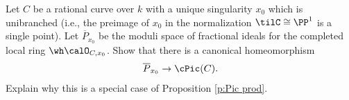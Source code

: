 \subsubsection{} Let $C$ be a rational curve over $k$ with a unique singularity $x_{0}$ which is unibranched (i.e., the preimage of $x_{0}$ in the normalization $\tilC\cong\PP^{1}$ is a single point).  Let $\overline{P}_{x_{0}}$ be the moduli space of fractional ideals for the completed local ring $\wh\calO_{C,x_{0}}$. Show that there is a canonical homeomorphism
\begin{equation*}
\overline{P}_{x_{0}}\to \cPic(C).
\end{equation*}
Explain why this is a special case of Proposition \ref{p:Pic prod}.

